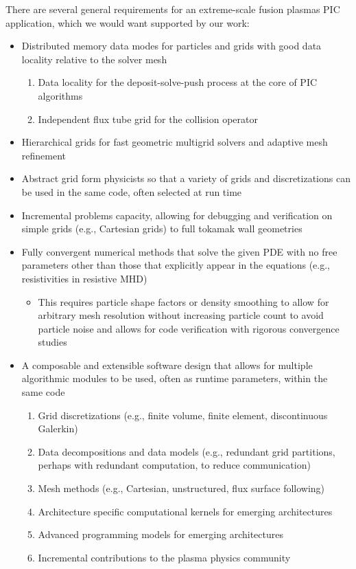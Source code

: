 \documentclass[review]{siamart}
\begin{document}
There are several general requirements for an extreme-scale fusion plasmas PIC application, which we would want supported by our work:
\begin{itemize}
\item Distributed memory data modes for particles and grids with good data locality relative to the solver mesh
\begin{enumerate}
\item Data locality for the deposit-solve-push process at the core of PIC algorithms
\item Independent flux tube grid for the collision operator
\end{enumerate}
\item Hierarchical grids for fast geometric multigrid solvers and adaptive mesh refinement
\item Abstract grid form physicists so that a variety of grids and discretizations can be used in the same code, often selected at run time
\item Incremental problems capacity, allowing for debugging and verification on simple grids (e.g., Cartesian grids) to full tokamak wall geometries
\item Fully convergent numerical methods that solve the given PDE with no free parameters other than those that explicitly appear in the equations (e.g., resistivities in resistive MHD)
\begin{itemize}
\item This requires particle shape factors or density smoothing to allow for arbitrary mesh resolution without increasing particle count to avoid particle noise and allows for code verification with rigorous convergence studies
\end{itemize}
\item A composable and extensible software design that allows for multiple algorithmic modules to be used, often as runtime parameters, within the same code
\begin{enumerate}
\item Grid discretizations (e.g., finite volume, finite element, discontinuous Galerkin)
\item Data decompositions and data models (e.g., redundant grid partitions, perhaps with redundant computation, to reduce communication)
\item Mesh methods (e.g., Cartesian, unstructured, flux surface following)
\item Architecture specific computational kernels for emerging architectures
\item Advanced programming models for emerging architectures \cite{KnepleyBrownMcInnesSmithRuppAdams2015}
\item Incremental contributions to the plasma physics community
\end{enumerate}
\end{itemize}
\end{document}
